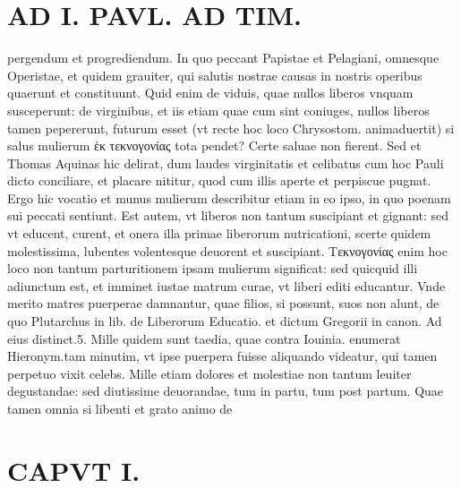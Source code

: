 \documentclass{article}
\begin{document}
\begin{pages}
\section*{AD I. PAVL. AD TIM. }
\marginpar{[ p.90 ]}\pstart pergendum et progrediendum. In quo peccant Papistae et Pelagiani, omnesque Operistae, et quidem grauiter, qui salutis nostrae causas in nostris operibus quaerunt et constituunt. Quid enim de viduis, quae nullos liberos vnquam susceperunt: de virginibus, et iis etiam quae cum sint coniuges, nullos liberos tamen pepererunt, futurum esset (vt recte hoc loco Chrysostom. animaduertit) si salus mulierum ἑκ τεκνογονίας tota pendet? Certe saluae non fierent. Sed et Thomas Aquinas hic delirat, dum laudes virginitatis et celibatus cum hoc Pauli dicto conciliare, et placare nititur, quod cum illis aperte et perpiscue pugnat. Ergo hic vocatio et munus mulierum describitur etiam in eo ipso, in quo poenam sui peccati sentiunt. Est autem, vt liberos non tantum suscipiant et gignant: sed vt educent, curent, et onera illa primae liberorum nutricationi, scerte quidem molestissima, lubentes volentesque deuorent et suscipiant. Tεκνογονίας enim hoc loco non tantum parturitionem ipsam mulierum significat: sed quicquid illi adiunctum est, et imminet iustae matrum curae, vt liberi editi educantur. Vnde merito matres puerperae damnantur, quae filios, si possunt, suos non alunt, de quo Plutarchus in lib.  de Liberorum Educatio. et dictum Gregorii in canon. Ad eius distinct.5. Mille quidem sunt taedia, quae contra Iouinia. enumerat Hieronym.tam minutim, vt ipse puerpera fuisse aliquando videatur, qui tamen perpetuo vixit celebs. Mille etiam dolores et molestiae non tantum leuiter degustandae: sed diutissime deuorandae, tum in partu, tum post partum. Quae tamen omnia si libenti et grato animo de\pend
\section*{CAPVT  I. }
\marginpar{[ p.91 ]}\pstart {}
{}

\end{pages}
\end{document}
